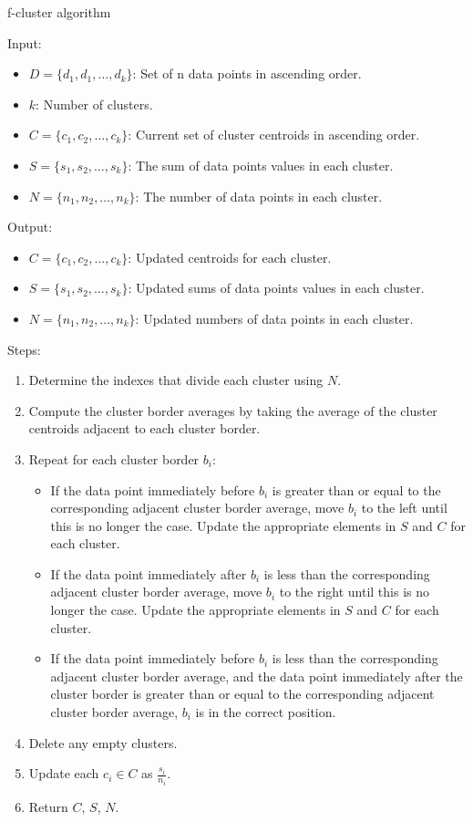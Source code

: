 \documentclass[conference,compsoc]{IEEEtran}
\begin{document}
\begin{algorithm}
    \caption{f-cluster algorithm}
    Input:
        \begin{itemize}
            \item $D = \{d_1, d_1, \dots, d_k\}$: Set of n data points in ascending order.
            \item $k$: Number of clusters.
            \item $C = \{c_1, c_2, \dots, c_k\}$: Current set of cluster centroids in ascending order.
            \item $S = \{s_1, s_2, \dots, s_k\}$: The sum of data points values in each cluster.
            \item $N = \{n_1, n_2, \dots, n_k\}$: The number of data points in each cluster.
        \end{itemize}
    Output:
        \begin{itemize}
            \item $C = \{c_1, c_2, \dots, c_k\}$: Updated centroids for each cluster.
            \item $S = \{s_1, s_2, \dots, s_k\}$: Updated sums of data points values in each cluster.
            \item $N = \{n_1, n_2, \dots, n_k\}$: Updated numbers of data points in each cluster.
        \end{itemize}
    Steps:
        \begin{enumerate}
            \item Determine the indexes that divide each cluster using $N$.
            \item Compute the cluster border averages by taking the average of the cluster centroids adjacent to each cluster border.
            \item Repeat for each cluster border $b_i$:
            \begin{itemize}
                \item If the data point immediately before $b_i$ is greater than or equal to the corresponding adjacent cluster border average, move $b_i$ to the left until this is no longer the case. Update the appropriate elements in $S$ and $C$ for each cluster.
                \item If the data point immediately after $b_i$ is less than the corresponding adjacent cluster border average, move $b_i$ to the right until this is no longer the case. Update the appropriate elements in $S$ and $C$ for each cluster.
                \item If the data point immediately before $b_i$ is less than the corresponding adjacent cluster border average, and the data point immediately after the cluster border is greater than or equal to the corresponding adjacent cluster border average, $b_i$ is in the correct position.
            \end{itemize}
            \item Delete any empty clusters.
            \item Update each $c_i \in C$ as $\frac{s_i}{n_i}$.
            \item Return $C$, $S$, $N$.
        \end{enumerate}
\end{algorithm}
\end{document}
